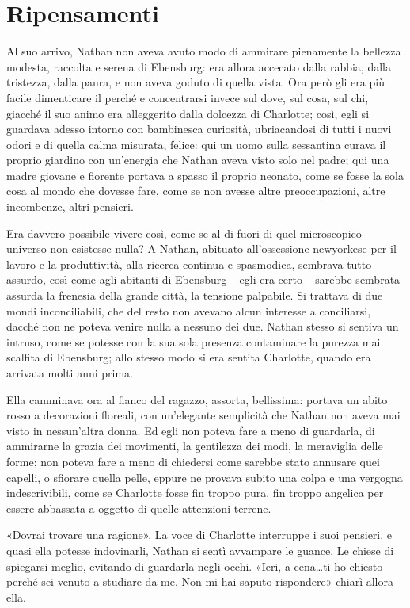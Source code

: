 \documentclass[a4paper,oneside,11pt]{memoir}
\begin{document}
\chapter{Ripensamenti}

Al suo arrivo, Nathan non aveva avuto modo di ammirare pienamente la bellezza
modesta, raccolta e serena di Ebensburg: era allora accecato dalla rabbia, dalla
tristezza, dalla paura, e non aveva goduto di quella vista. Ora però gli era più
facile dimenticare il perché e concentrarsi invece sul dove, sul cosa, sul chi,
giacché il suo animo era alleggerito dalla dolcezza di Charlotte; così, egli si
guardava adesso intorno con bambinesca curiosità, ubriacandosi di tutti i nuovi
odori e di quella calma misurata, felice: qui un uomo sulla sessantina curava il
proprio giardino con un'energia che Nathan aveva visto solo nel padre; qui una
madre giovane e fiorente portava a spasso il proprio neonato, come se fosse la
sola cosa al mondo che dovesse fare, come se non avesse altre preoccupazioni,
altre incombenze, altri pensieri.

Era davvero possibile vivere così, come se al di fuori di quel microscopico
universo non esistesse nulla? A Nathan, abituato all'ossessione newyorkese per
il lavoro e la produttività, alla ricerca continua e spasmodica, sembrava tutto
assurdo, così come agli abitanti di Ebensburg -- egli era certo -- sarebbe
sembrata assurda la frenesia della grande città, la tensione palpabile. Si
trattava di due mondi inconciliabili, che del resto non avevano alcun interesse
a conciliarsi, dacché non ne poteva venire nulla a nessuno dei due. Nathan
stesso si sentiva un intruso, come se potesse con la sua sola presenza
contaminare la purezza mai scalfita di Ebensburg; allo stesso modo si era
sentita Charlotte, quando era arrivata molti anni prima.

Ella camminava ora al fianco del ragazzo, assorta, bellissima: portava un abito
rosso a decorazioni floreali, con un'elegante semplicità che Nathan non aveva
mai visto in nessun'altra donna. Ed egli non poteva fare a meno di guardarla, di
ammirarne la grazia dei movimenti, la gentilezza dei modi, la meraviglia delle
forme; non poteva fare a meno di chiedersi come sarebbe stato annusare quei
capelli, o sfiorare quella pelle, eppure ne provava subito una colpa e una
vergogna indescrivibili, come se Charlotte fosse fin troppo pura, fin troppo
angelica per essere abbassata a oggetto di quelle attenzioni terrene.

«Dovrai trovare una ragione». La voce di Charlotte interruppe i suoi pensieri, e
quasi ella potesse indovinarli, Nathan si sentì avvampare le guance. Le chiese
di spiegarsi meglio, evitando di guardarla negli occhi. «Ieri, a cena\dots ti ho
chiesto perché sei venuto a studiare da me. Non mi hai saputo rispondere» chiarì
allora ella.
\end{document}
